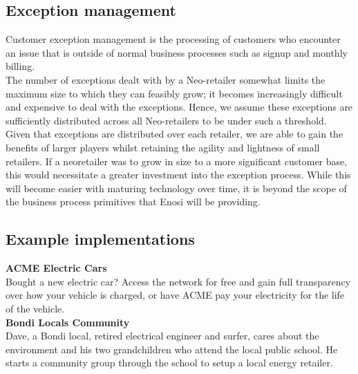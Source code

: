 \documentclass{article}
\theoremstyle{definition}
\theoremstyle{plain} %
\begin{document}
\subsection{Exception management}

\noindent Customer exception management is the processing of customers who encounter an issue that is outside of normal business processes such as signup and monthly billing.\\

\noindent The number of exceptions dealt with by a Neo-retailer somewhat limits the maximum size to which they can feasibly grow; it becomes increasingly difficult and expensive to deal with the exceptions. Hence, we assume these exceptions are sufficiently distributed across all Neo-retailers to be under such a threshold. \\

\noindent Given that exceptions are distributed over each retailer, we are able to gain the benefits of larger players whilst retaining the agility and lightness of small retailers. If a neoretailer was to grow in size to a more significant customer base, this would necessitate a greater investment into the exception process. While this will become easier with maturing technology over time, it is beyond the scope of the business process primitives that Enosi will be providing.

\subsection{Example implementations}

\textbf{ACME Electric Cars}\\

\noindent Bought a new electric car? Access the network for free and gain full transparency over how your vehicle is charged, or have ACME pay your electricity for the life of the vehicle.\\

\noindent \textbf{Bondi Locals Community}\\

\noindent Dave, a Bondi local, retired electrical engineer and surfer, cares about the environment and his two grandchildren who attend the local public school. He starts a community group through the school to setup a local energy retailer. 



\end{document}
